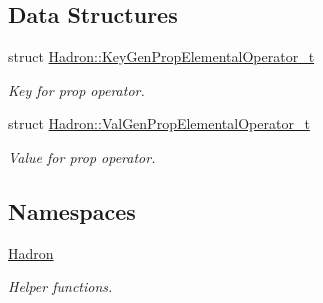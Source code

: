 \subsection*{Data Structures}
\begin{DoxyCompactItemize}
\item 
struct \mbox{\hyperlink{structHadron_1_1KeyGenPropElementalOperator__t}{Hadron\+::\+Key\+Gen\+Prop\+Elemental\+Operator\+\_\+t}}
\begin{DoxyCompactList}\small\item\em Key for prop operator. \end{DoxyCompactList}\item 
struct \mbox{\hyperlink{structHadron_1_1ValGenPropElementalOperator__t}{Hadron\+::\+Val\+Gen\+Prop\+Elemental\+Operator\+\_\+t}}
\begin{DoxyCompactList}\small\item\em Value for prop operator. \end{DoxyCompactList}\end{DoxyCompactItemize}
\subsection*{Namespaces}
\begin{DoxyCompactItemize}
\item 
 \mbox{\hyperlink{namespaceHadron}{Hadron}}
\begin{DoxyCompactList}\small\item\em Helper functions. \end{DoxyCompactList}\end{DoxyCompactItemize}
